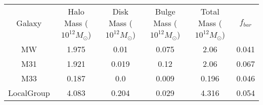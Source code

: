 \begin{table}
\begin{tabular}{cccccc}
Galaxy & Halo Mass ($10^{12} M_{\odot}$) & Disk Mass ($10^{12} M_{\odot}$) & Bulge Mass ($10^{12} M_{\odot}$) & Total Mass ($10^{12} M_{\odot}$) & $f_{bar}$ \\
MW & 1.975 & 0.01 & 0.075 & 2.06 & 0.041 \\
M31 & 1.921 & 0.019 & 0.12 & 2.06 & 0.067 \\
M33 & 0.187 & 0.0 & 0.009 & 0.196 & 0.046 \\
LocalGroup & 4.083 & 0.204 & 0.029 & 4.316 & 0.054 \\
\end{tabular}
\end{table}

